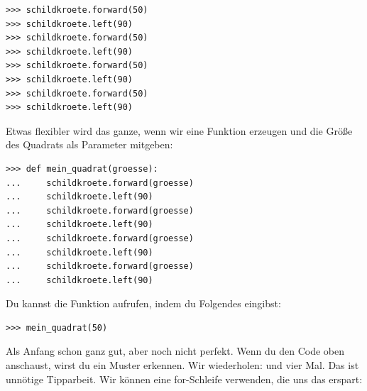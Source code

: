 \begin{Verbatim}[frame=single]
>>> schildkroete.forward(50)
>>> schildkroete.left(90)
>>> schildkroete.forward(50)
>>> schildkroete.left(90)
>>> schildkroete.forward(50)
>>> schildkroete.left(90)
>>> schildkroete.forward(50)
>>> schildkroete.left(90)
\end{Verbatim}

Etwas flexibler wird das ganze, wenn wir eine Funktion erzeugen und die Größe des Quadrats als Parameter mitgeben:

\begin{Verbatim}[frame=single]
>>> def mein_quadrat(groesse):
...     schildkroete.forward(groesse)
...     schildkroete.left(90)
...     schildkroete.forward(groesse)
...     schildkroete.left(90)
...     schildkroete.forward(groesse)
...     schildkroete.left(90)
...     schildkroete.forward(groesse)
...     schildkroete.left(90)
\end{Verbatim}

\noindent
Du kannst die Funktion aufrufen, indem du Folgendes eingibst:

\begin{Verbatim}[frame=single]
>>> mein_quadrat(50)
\end{Verbatim}

Als Anfang schon ganz gut, aber noch nicht perfekt. Wenn du den Code oben anschaust, wirst du ein Muster erkennen. Wir wiederholen:  und  vier Mal. Das ist unnötige Tipparbeit. Wir können eine for-Schleife verwenden, die uns das erspart:

